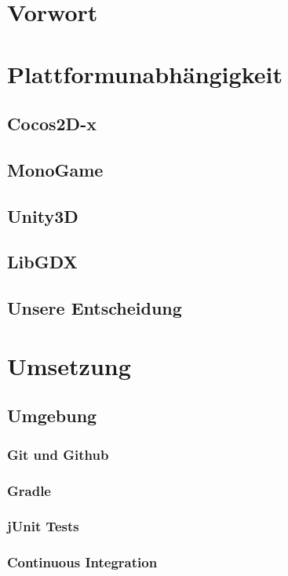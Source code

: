 \section{Vorwort}									
\section{Plattformunabhängigkeit}					
	\subsection{Cocos2D-x}							
	\subsection{MonoGame}							
	\subsection{Unity3D}							
	\subsection{LibGDX}								
	\subsection{Unsere Entscheidung}				
\section{Umsetzung}
	\subsection{Umgebung}
		\subsubsection{Git und Github}				
		\subsubsection{Gradle}						
		\subsubsection{jUnit Tests}					
		\subsubsection{Continuous Integration}		
